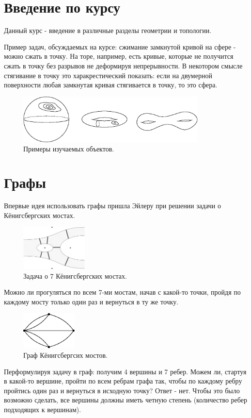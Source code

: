 \documentclass[12pt]{article}
\theoremstyle{definition}
\begin{document}
\section*{Введение по курсу}
Данный курс - введение в различные разделы геометрии и топологии.

Пример задач, обсуждаемых на курсе: сжимание замкнутой кривой на сфере - можно сжать в точку. На торе, например, есть кривые, которые не получится сжать в точку без разрывов не деформируя непрерывности. В некотором смысле стягивание в точку это харакрестический показать: если на двумерной поверхности любая замкнутая кривая стягивается в точку, то это сфера.
\begin{figure}[H]
	\centering
	\includegraphics[width=0.85\textwidth]{1_1.eps}
	\caption{Примеры изучаемых объектов.}
	\label{1_1}
\end{figure}

\section*{Графы}

Впервые идея использовать графы пришла Эйлеру при решении задачи о Кёнигсбергских мостах.
\begin{figure}[H]
	\centering
	\includegraphics[width=0.3\textwidth]{1_2.png}
	\caption{Задача о 7 Кёнигсбергских мостах.}
	\label{1_2}
\end{figure}
Можно ли прогуляться по всем 7-ми мостам, начав с какой-то точки, пройдя по каждому мосту только один раз и вернуться в ту же точку.

\begin{figure}[H]
	\centering
	\includegraphics[width=0.25\textwidth]{1_3.eps}
	\caption{Граф Кёнигсбергсих мостов.}
	\label{1_3}
\end{figure}
Перформулируя задачу в граф: получим 4 вершины и 7 ребер. Можем ли, стартуя в какой-то вершине, пройти по всем ребрам графа так, чтобы по каждому ребру пройтись один раз и вернуться в исходную точку? Ответ - нет. Чтобы это было возможно сделать, все вершины должны иметь четную степень (количество ребер подходящих к вершинам).
\end{document}
